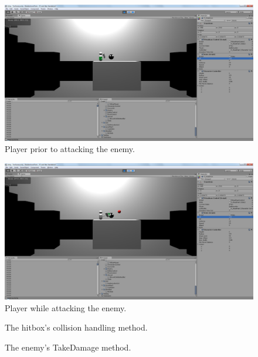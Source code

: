 \documentclass{article}
\begin{document}
\begin{figure}[h!]

\includegraphics[width=5in]{Graphics/Pre_Hit.png}
\caption{Player prior to attacking the enemy.}
\label{PreHit}

\end{figure}

\begin{figure}[h!]

\includegraphics[width=5in]{Graphics/During_Hit.png}
\caption{Player while attacking the enemy.}
\label{DuringHit}

\end{figure}

\begin{figure}[htbp]
	
	\caption{The hitbox's collision handling method.}
	\label{CollideHandler}
\end{figure}

\begin{figure}[htbp]
	
	\caption{The enemy's TakeDamage method.}
	\label{TakeDamage}
\end{figure}
\end{document}
